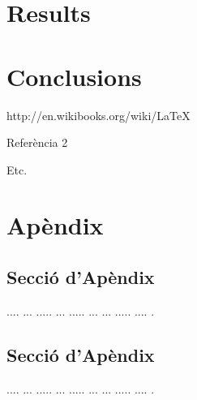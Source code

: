 ﻿\documentclass[10pt,a4paper,twocolumn,twoside]{article}
\begin{document}
\section{Results}
\section{Conclusions}

\begin{thebibliography}{11}
http://en.wikibooks.org/wiki/LaTeX

Referència 2

Etc.

\end{thebibliography}

\appendix

\section*{Apèndix}

\setcounter{section}{1}

\subsection{Secció d'Apèndix}
.... ... ..... ... ..... ... ... ..... .... .

\subsection{Secció d'Apèndix}
.... ... ..... ... ..... ... ... ..... .... .
\end{document}
